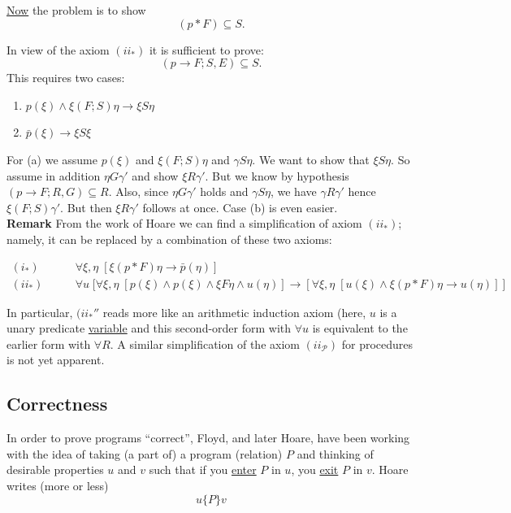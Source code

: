 \documentclass{article}
\newcommand{\scP}{\mathscr{P}}
\begin{document}
\underline{Now} the problem is to show 
\begin{equation*}
    (p*F) \subseteq S.
\end{equation*}

In view of the axiom $(ii_{*})$ it is sufficient to prove:
\begin{equation*}
    (p \to F; S, E) \subseteq S.
\end{equation*}
This requires two cases:
\begin{enumerate}[label=(\alph*)]
    \item $p(\xi) \wedge \xi (F; S) \eta \to \xi S \eta$ 
    \item $\bar{p}(\xi) \to \xi S \xi$ 
\end{enumerate}

For (a) we assume $p(\xi)$ and $\xi (F; S) \eta$ and $\gamma S \eta$. We want to show that $\xi S \eta$. So assume in addition $\eta G \gamma'$ and show $\xi R \gamma'$. But we know by hypothesis $(p \to F; R, G) \subseteq R$. Also, since $\eta G \gamma'$ holds and $\gamma S \eta$,  we have $\gamma R \gamma'$ hence $\xi (F; S) \gamma'$. But then $\xi R \gamma'$ follows at once. Case (b) is even easier. \\

\noindent\textbf{Remark} From the work of Hoare we can find a simplification of axiom $(ii_{*})$; namely, it can be replaced by a combination of these two axioms:

\begin{align*}
    (i_{*}) \quad\quad & \forall \xi, \eta \;[\xi (p*F)\eta \to \bar{p}(\eta)] \\
    (ii_{*}) \quad\quad & \forall u \;[\forall \xi, \eta\;[p(\xi) \wedge p(\xi) \wedge \xi F \eta \wedge u(\eta)] \to [\forall \xi, \eta\;[u(\xi) \wedge \xi (p*F) \eta \to u(\eta)]] 
\end{align*}

In particular, $(ii_{*}''$ reads more like an arithmetic induction axiom (here, $u$ is a unary predicate \underline{variable} and this second-order form with $\forall u$ is equivalent to the earlier form with $\forall R$. A similar simplification of the axiom $(ii_\scP)$ for procedures is not yet apparent. 

\subsection{Correctness}
In order to prove programs ``correct'', Floyd, and later Hoare, have been working with the idea of taking (a part of) a program (relation) $P$ and thinking of desirable properties $u$ and $v$ such that if you \underline{enter} $P$ in $u$, you \underline{exit} $P$ in $v$. Hoare writes (more or less)
\begin{equation*}
    u \{ P \} v
\end{equation*}
\end{document}
